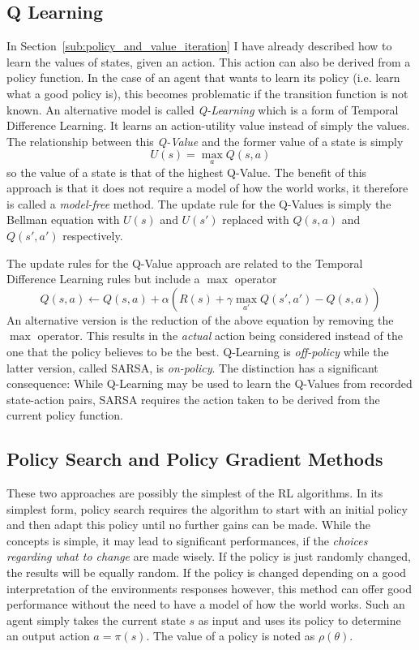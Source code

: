 \subsection{Q Learning}%
\label{sub:q_learning}

In Section~\ref{sub:policy_and_value_iteration} I have already described how to learn the values of states, given an
action. This action can also be derived from a policy function.  In the case of an agent that wants to learn its policy
(i.e. learn what a good policy is), this becomes problematic if the transition function is not known. An alternative
model is called \emph{Q-Learning} which is a form of Temporal Difference Learning. It learns an action-utility value
instead of simply the values. The relationship between this \emph{Q-Value} and the former value of a state is simply
\begin{equation}
    U(s) = \max_{a}Q(s,a)
\end{equation}
so the value of a state is that of the highest Q-Value. The benefit of this approach is that it does not require a model
of how the world works, it therefore is called a \emph{model-free} method. The update rule for the Q-Values is simply
the Bellman equation with $U(s)$ and $U(s')$ replaced with $Q(s,a)$ and $Q(s',a')$ respectively.

The update rules for the Q-Value approach are related to the Temporal Difference Learning rules but include a $\max$
operator
\begin{equation}
    Q(s,a) \gets Q(s,a) + \alpha(R(s) + \gamma \max_{a'}Q(s', a') - Q(s,a))
\end{equation}
An alternative version is the reduction of the above equation by removing the $\max$ operator. This results in the
\emph{actual} action being considered instead of the one that the policy believes to be the best. Q-Learning is
\emph{off-policy} while the latter version, called \ac{SARSA}, is \emph{on-policy}. The distinction has a significant
consequence: While Q-Learning may be used to learn the Q-Values from recorded state-action pairs, \ac{SARSA} requires
the action taken to be derived from the current policy function.

\subsection{Policy Search and Policy Gradient Methods}%
\label{sub:policy_search_and_policy_gradient_methods}

These two approaches are possibly the simplest of the \ac{RL} algorithms. In its simplest form, policy search requires
the algorithm to start with an initial policy and then adapt this policy until no further gains can be made. While the
concepts is simple, it may lead to significant performances, if the \emph{choices regarding what to change} are made
wisely. If the policy is just randomly changed, the results will be equally random. If the policy is changed depending
on a good interpretation of the environments responses however, this method can offer good performance without the need
to have a model of how the world works. Such an agent simply takes the current state $s$ as input and uses its policy to
determine an output action $a = \pi(s)$. The value of a policy is noted as $\rho(\theta)$.

